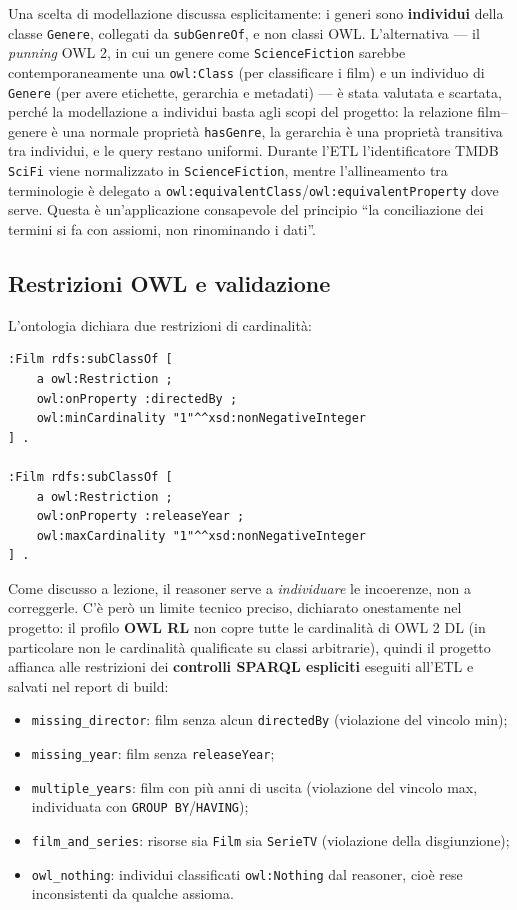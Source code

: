 \documentclass[a4paper,11pt]{article}
\newcommand{\code}[1]{\texttt{#1}}
\begin{document}
Una scelta di modellazione discussa esplicitamente: i generi sono
\textbf{individui} della classe \code{Genere}, collegati da
\code{subGenreOf}, e non classi OWL. L'alternativa --- il \emph{punning}
OWL 2, in cui un genere come \code{ScienceFiction} sarebbe
contemporaneamente una \code{owl:Class} (per classificare i film) e un
individuo di \code{Genere} (per avere etichette, gerarchia e metadati) ---
\`e stata valutata e scartata, perch\'e la modellazione a individui basta
agli scopi del progetto: la relazione film--genere \`e una normale propriet\`a
\code{hasGenre}, la gerarchia \`e una propriet\`a transitiva tra individui, e
le query restano uniformi. Durante l'ETL l'identificatore TMDB
\code{SciFi} viene normalizzato in \code{ScienceFiction}, mentre
l'allineamento tra terminologie \`e delegato a
\code{owl:equivalentClass}/\code{owl:equivalentProperty} dove serve. Questa
\`e un'applicazione consapevole del principio ``la conciliazione dei
termini si fa con assiomi, non rinominando i dati''.

\subsection{Restrizioni OWL e validazione}\label{sec:validazione}

L'ontologia dichiara due restrizioni di cardinalit\`a:

\begin{lstlisting}[style=ttl, caption={Restrizioni di cardinalit\`a su
\code{Film}.}]
:Film rdfs:subClassOf [
    a owl:Restriction ;
    owl:onProperty :directedBy ;
    owl:minCardinality "1"^^xsd:nonNegativeInteger
] .

:Film rdfs:subClassOf [
    a owl:Restriction ;
    owl:onProperty :releaseYear ;
    owl:maxCardinality "1"^^xsd:nonNegativeInteger
] .
\end{lstlisting}

Come discusso a lezione, il reasoner serve a \emph{individuare} le
incoerenze, non a correggerle. C'\`e per\`o un limite tecnico preciso,
dichiarato onestamente nel progetto: il profilo \textbf{OWL RL} non copre
tutte le cardinalit\`a di OWL 2 DL (in particolare non le cardinalit\`a
qualificate su classi arbitrarie), quindi il progetto affianca alle
restrizioni dei \textbf{controlli SPARQL espliciti} eseguiti
all'ETL e salvati nel report di build:

\begin{itemize}[nosep]
  \item \code{missing\_director}: film senza alcun \code{directedBy}
        (violazione del vincolo min);
  \item \code{missing\_year}: film senza \code{releaseYear};
  \item \code{multiple\_years}: film con pi\`u anni di uscita (violazione
        del vincolo max, individuata con \code{GROUP BY}/\code{HAVING});
  \item \code{film\_and\_series}: risorse sia \code{Film} sia
        \code{SerieTV} (violazione della disgiunzione);
  \item \code{owl\_nothing}: individui classificati \code{owl:Nothing} dal
        reasoner, cio\`e rese inconsistenti da qualche assioma.
\end{itemize}
\end{document}
